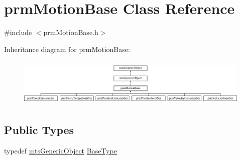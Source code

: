 \hypertarget{classprm_motion_base}{}\section{prm\+Motion\+Base Class Reference}
\label{classprm_motion_base}


{\ttfamily \#include $<$prm\+Motion\+Base.\+h$>$}

Inheritance diagram for prm\+Motion\+Base\+:\begin{figure}[H]
\begin{center}
\leavevmode
\includegraphics[height=2.348008cm]{db/d1f/classprm_motion_base}
\end{center}
\end{figure}
\subsection*{Public Types}
\begin{DoxyCompactItemize}
\item 
typedef \hyperlink{classmts_generic_object}{mts\+Generic\+Object} \hyperlink{classprm_motion_base_aef2350979e92dcdd61088ee026a8b87b}{Base\+Type}
\end{DoxyCompactItemize}
